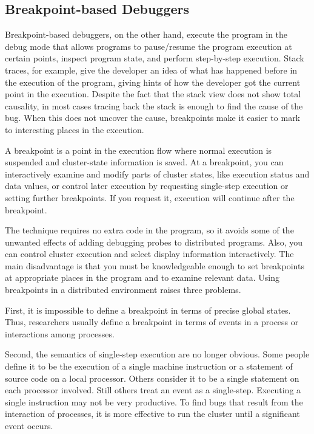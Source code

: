 \subsection{Breakpoint-based Debuggers}

	
	Breakpoint-based debuggers, on the other hand, execute the program in the debug mode that allows programs to pause/resume the program execution at certain points, inspect program state, and perform step-by-step execution. Stack traces, for example, give the developer an idea of what has happened before in the execution of the program, giving hints of how the developer got the current point in the execution. Despite the fact that the stack view does not show total causality, in most cases tracing back the stack is enough to find the cause of the bug. When this does not uncover the cause, breakpoints make it easier to mark to interesting places in the execution.
	
	A breakpoint is a point in the execution flow where normal execution is suspended and cluster-state information is saved. At a breakpoint, you can interactively examine and modify parts of cluster states, like execution status and data values, or control later execution by requesting single-step execution or setting further breakpoints. If you request it, execution will continue after the breakpoint.
	
	The technique requires no extra code in the program, so it avoids some of the unwanted effects of adding debugging probes to distributed programs. Also, you can control cluster execution and select display information interactively. The main disadvantage is that you must be knowledgeable enough to set breakpoints at appropriate places in the program and to examine relevant data. Using breakpoints in a distributed environment raises three problems.
	
	First, it is impossible to define a breakpoint in terms of precise global states. Thus, researchers usually define a breakpoint in terms of events in a process or interactions among processes.
	
	Second, the semantics of single-step execution are no longer obvious. Some people define it to be the execution of a single machine instruction or a statement of source code on a local processor. Others consider it to be a single statement on each processor involved. Still others treat an event as a single-step. Executing a single instruction may not be very productive. To find bugs that result from the interaction of processes, it is more effective to run the cluster until a significant event occurs.
	
